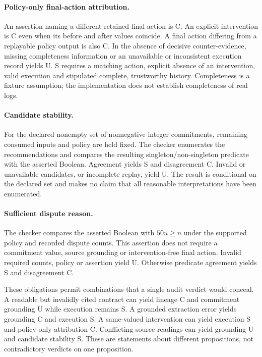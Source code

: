 \paragraph{Policy-only final-action attribution.}
An assertion naming a different retained final action is C. An explicit intervention is C even when its before and after values coincide. A final action differing from a replayable policy output is also C. In the absence of decisive counter-evidence, missing completeness information or an unavailable or inconsistent execution record yields U. S requires a matching action, explicit absence of an intervention, valid execution and stipulated complete, trustworthy history. Completeness is a fixture assumption; the implementation does not establish completeness of real logs.

\paragraph{Candidate stability.}
For the declared nonempty set of nonnegative integer commitments, remaining consumed inputs and policy are held fixed. The checker enumerates the recommendations and compares the resulting singleton/non-singleton predicate with the asserted Boolean. Agreement yields S and disagreement C. Invalid or unavailable candidates, or incomplete replay, yield U. The result is conditional on the declared set and makes no claim that all reasonable interpretations have been enumerated.

\paragraph{Sufficient dispute reason.}
The checker compares the asserted Boolean with $50u\geq n$ under the supported policy and recorded dispute counts. This assertion does not require a commitment value, source grounding or intervention-free final action. Invalid required counts, policy or assertion yield U. Otherwise predicate agreement yields S and disagreement C.

These obligations permit combinations that a single audit verdict would conceal. A readable but invalidly cited contract can yield lineage C and commitment grounding U while execution remains S. A grounded extraction error yields grounding C and execution S. A same-valued intervention can yield execution S and policy-only attribution C. Conflicting source readings can yield grounding U and candidate stability S. These are statements about different propositions, not contradictory verdicts on one proposition.

